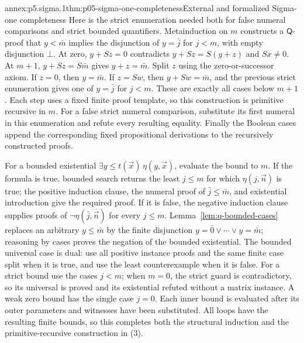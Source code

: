 \begin{annexitem}{annex:p5.sigma.1}{thm:p05-sigma-one-completeness}{External and formalized Sigma-one completeness}
Here is the strict enumeration needed both for false numeral comparisons
and strict bounded quantifiers. Metainduction on \(m\) constructs a
\(\mathsf Q\)-proof that \(y<\bar m\) implies the disjunction of
\(y=\bar j\) for \(j<m\), with empty disjunction \(\bot\).
At zero, \(y+Sz=0\) contradicts \(y+Sz=S(y+z)\) and \(Sx\ne0\).
At \(m+1\), \(y+Sz=S\bar m\) gives \(y+z=\bar m\).
Split \(z\) using the zero-or-successor axiom. If \(z=0\), then
\(y=\bar m\). If \(z=Sw\), then \(y+Sw=\bar m\), and the
previous strict enumeration gives one of \(y=\bar j\) for \(j<m\).
These are exactly all cases below \(m+1\). Each step uses a fixed finite
proof template, so this construction is primitive recursive in \(m\).
For a false strict numeral comparison, substitute its first numeral in
this enumeration and refute every resulting equality. Finally the Boolean
cases append the corresponding fixed propositional derivations to the
recursively constructed proofs.

For a bounded existential
\(\exists y\leq t(\vec x)\,\eta(y,\vec x)\), evaluate the bound to \(m\).
If the formula is true, bounded search returns the least \(j\leq m\) for which
\(\eta(j,\vec n)\) is true; the positive induction clause, the numeral proof
of \(\bar j\leq\bar m\), and existential introduction give the required
proof.  If it is false, the negative induction clause supplies proofs of
\(\neg\eta(\bar j,\overline{\vec n})\) for every \(j\leq m\).
Lemma~\ref{lem:q-bounded-cases} replaces an arbitrary
\(y\leq\bar m\) by the finite disjunction
\(y=\bar0\lor\cdots\lor y=\bar m\); reasoning by cases proves the negation
of the bounded existential.  The bounded universal case is dual: use all
positive instance proofs and the same finite case split when it is true, and
use the least counterexample when it is false. For a strict bound use the
cases \(j<m\); when \(m=0\), the strict guard is contradictory, so its
universal is proved and its existential refuted without a matrix instance.
A weak zero bound has the single case \(j=0\). Each inner bound is
evaluated after its outer parameters and witnesses have been substituted.
All loops have the resulting finite bounds, so this completes both the
structural induction and the primitive-recursive construction in (3).


\end{annexitem}
